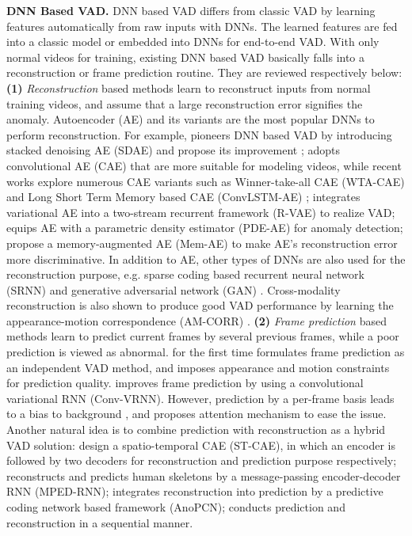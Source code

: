 \documentclass[sigconf]{acmart}
\begin{document}
\textbf{DNN Based VAD.}
DNN based VAD differs from classic VAD by learning features automatically from raw inputs with DNNs. The learned features are fed into a classic model or embedded into DNNs for end-to-end VAD. With only normal videos for training, existing DNN based VAD basically falls into a reconstruction or frame prediction routine. They are reviewed respectively below: \textbf{(1)} \textit{Reconstruction} based methods learn to reconstruct inputs from normal training videos, and assume that a large reconstruction error signifies the anomaly. Autoencoder (AE) and its variants are the most popular DNNs to perform reconstruction. For example, \cite{xu2015learning} pioneers DNN based VAD by introducing stacked denoising AE (SDAE) and propose its improvement \cite{xu2017detecting}; \cite{hasan2016learning} adopts convolutional AE (CAE) that are more suitable for modeling videos, while recent works explore numerous CAE variants such as Winner-take-all CAE (WTA-CAE) \cite{tran2017anomaly} and Long Short Term Memory based CAE (ConvLSTM-AE) \cite{luo2017remembering}; \cite{yan2018abnormal} integrates variational AE into a two-stream recurrent framework (R-VAE) to realize VAD; \cite{abati2019latent} equips AE with a parametric density estimator (PDE-AE) for anomaly detection; \cite{Gong_2019_ICCV} propose a memory-augmented AE (Mem-AE) to make AE's reconstruction error more discriminative. In addition to AE, other types of DNNs are also used for the reconstruction purpose, e.g. sparse coding based recurrent neural network (SRNN) \cite{luo2017revisit} and generative adversarial network (GAN) \cite{ravanbakhsh2017abnormal,sabokrou2018adversarially}. Cross-modality reconstruction is also shown to produce good VAD performance by learning the appearance-motion correspondence (AM-CORR) \cite{nguyen2019anomaly}. \textbf{(2)} \textit{Frame prediction} based methods learn to predict current frames by several previous frames, while a poor prediction is viewed as abnormal. \cite{liu2018future} for the first time formulates frame prediction as an independent VAD method, and imposes appearance and motion constraints for prediction quality. \cite{lu2019future} improves frame prediction by using a convolutional variational RNN (Conv-VRNN). However, prediction by a per-frame basis leads to a bias to background \cite{liu2019exploring}, and \cite{zhou2019attention} proposes attention mechanism to ease the issue. Another natural idea is to combine prediction with reconstruction as a hybrid VAD solution: \cite{zhao2017spatio} design a spatio-temporal CAE (ST-CAE), in which an encoder is followed by two decoders for reconstruction and prediction purpose respectively; \cite{morais2019learning} reconstructs and predicts human skeletons by a message-passing encoder-decoder RNN (MPED-RNN); \cite{ye2019anopcn} integrates reconstruction into prediction by a predictive coding network based framework (AnoPCN); \cite{tang2020integrating} conducts prediction and reconstruction in a sequential manner.
\end{document}
